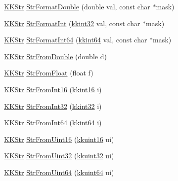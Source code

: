\begin{DoxyCompactItemize}
\hyperlink{class_k_k_b_1_1_k_k_str}{K\+K\+Str} \hyperlink{namespace_k_k_b_a1a40a40e955fa5417a7cdd990e0021b1}{Str\+Format\+Double} (double val, const char $\ast$mask)
\item 
\hyperlink{class_k_k_b_1_1_k_k_str}{K\+K\+Str} \hyperlink{namespace_k_k_b_ae3bde258fa036604fac8bdb0277ab46e}{Str\+Format\+Int} (\hyperlink{namespace_k_k_b_a8fa4952cc84fda1de4bec1fbdd8d5b1b}{kkint32} val, const char $\ast$mask)
\item 
\hyperlink{class_k_k_b_1_1_k_k_str}{K\+K\+Str} \hyperlink{namespace_k_k_b_a5a61958a2cb00ae5c697a1547ad01121}{Str\+Format\+Int64} (\hyperlink{namespace_k_k_b_aa3486b1c5ea9162b3b020c69f72826eb}{kkint64} val, const char $\ast$mask)
\item 
\hyperlink{class_k_k_b_1_1_k_k_str}{K\+K\+Str} \hyperlink{namespace_k_k_b_a064d022f1f3d94c191e11c5e4bceb4a7}{Str\+From\+Double} (double d)
\item 
\hyperlink{class_k_k_b_1_1_k_k_str}{K\+K\+Str} \hyperlink{namespace_k_k_b_aa19267de8ebca7b146b5aef6b2c27df9}{Str\+From\+Float} (float f)
\item 
\hyperlink{class_k_k_b_1_1_k_k_str}{K\+K\+Str} \hyperlink{namespace_k_k_b_a197206fb786776e54355a462b6181aac}{Str\+From\+Int16} (\hyperlink{namespace_k_k_b_a93809780ee294124dda4c23069f41248}{kkint16} i)
\item 
\hyperlink{class_k_k_b_1_1_k_k_str}{K\+K\+Str} \hyperlink{namespace_k_k_b_a66adf53f607bda7ab0d3e1c3945e792e}{Str\+From\+Int32} (\hyperlink{namespace_k_k_b_a8fa4952cc84fda1de4bec1fbdd8d5b1b}{kkint32} i)
\item 
\hyperlink{class_k_k_b_1_1_k_k_str}{K\+K\+Str} \hyperlink{namespace_k_k_b_ad007937ca83cb95064fa2f74531481aa}{Str\+From\+Int64} (\hyperlink{namespace_k_k_b_aa3486b1c5ea9162b3b020c69f72826eb}{kkint64} i)
\item 
\hyperlink{class_k_k_b_1_1_k_k_str}{K\+K\+Str} \hyperlink{namespace_k_k_b_a4341de514fd3446b577dde3220ee0f75}{Str\+From\+Uint16} (\hyperlink{namespace_k_k_b_aa8c7d4d30381c8a0b6fce68974a9c8a9}{kkuint16} ui)
\item 
\hyperlink{class_k_k_b_1_1_k_k_str}{K\+K\+Str} \hyperlink{namespace_k_k_b_a3cfc4769d4e2de370b13062faefc8235}{Str\+From\+Uint32} (\hyperlink{namespace_k_k_b_af8d832f05c54994a1cce25bd5743e19a}{kkuint32} ui)
\item 
\hyperlink{class_k_k_b_1_1_k_k_str}{K\+K\+Str} \hyperlink{namespace_k_k_b_ad5e46dcf9ae747e21042343ec5f9085c}{Str\+From\+Uint64} (\hyperlink{namespace_k_k_b_a1f2b0568d3b63cc7697dcff73250113e}{kkuint64} ui)
\item 

\end{DoxyCompactItemize}
